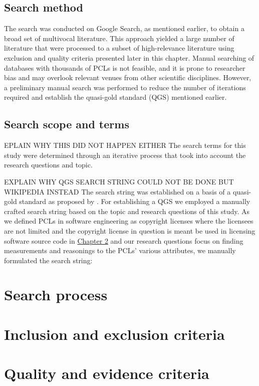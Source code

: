 \subsection{Search method}
The search was conducted on Google Search, as mentioned earlier, to obtain a broad set of multivocal literature. This approach yielded a large number of literature that were processed to a subset of high-relevance literature using exclusion and quality criteria presented later in this chapter. Manual searching of databases with thousands of PCLs is not feasible, and it is prone to researcher bias and may overlook relevant venues from other scientific disciplines. However, a preliminary manual search was performed to reduce the number of iterations required and establish the quasi-gold standard (QGS) mentioned earlier.
\subsection{Search scope and terms}
EPLAIN WHY THIS DID NOT HAPPEN EITHER
The search terms for this study were determined through an iterative process that took into account the research questions and topic.

EXPLAIN WHY QGS SEARCH STRING COULD NOT BE DONE BUT WIKIPEDIA INSTEAD
The search string was established on a basis of a quasi-gold standard as proposed by \cite{qgs}. For establishing a QGS we employed a manually crafted search string based on the topic and research questions of this study. As we defined PCLs in software engineering as copyright licenses where the licensees are not limited and the copyright license in question is meant be used in licensing software source code in \hyperref[methods]{Chapter 2} and our research questions focus on finding measurements and reasonings to the PCLs' various attributes, we manually formulated the search string:

\section{Search process}
\section{Inclusion and exclusion criteria}
\section{Quality and evidence criteria}
